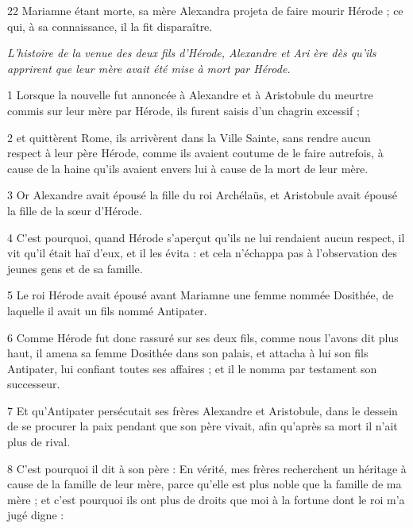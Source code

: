 \par 22 Mariamne étant morte, sa mère Alexandra projeta de faire mourir Hérode ; ce qui, à sa connaissance, il la fit disparaître.


\par \textit{L'histoire de la venue des deux fils d'Hérode, Alexandre et Ari ère dès qu'ils apprirent que leur mère avait été mise à mort par Hérode.}

\par 1 Lorsque la nouvelle fut annoncée à Alexandre et à Aristobule du meurtre commis sur leur mère par Hérode, ils furent saisis d'un chagrin excessif ;

\par 2 et quittèrent Rome, ils arrivèrent dans la Ville Sainte, sans rendre aucun respect à leur père Hérode, comme ils avaient coutume de le faire autrefois, à cause de la haine qu'ils avaient envers lui à cause de la mort de leur mère.

\par 3 Or Alexandre avait épousé la fille du roi Archélaüs, et Aristobule avait épousé la fille de la sœur d'Hérode.

\par 4 C'est pourquoi, quand Hérode s'aperçut qu'ils ne lui rendaient aucun respect, il vit qu'il était haï d'eux, et il les évita : et cela n'échappa pas à l'observation des jeunes gens et de sa famille.

\par 5 Le roi Hérode avait épousé avant Mariamne une femme nommée Dosithée, de laquelle il avait un fils nommé Antipater.

\par 6 Comme Hérode fut donc rassuré sur ses deux fils, comme nous l'avons dit plus haut, il amena sa femme Dosithée dans son palais, et attacha à lui son fils Antipater, lui confiant toutes ses affaires ; et il le nomma par testament son successeur.

\par 7 Et qu'Antipater persécutait ses frères Alexandre et Aristobule, dans le dessein de se procurer la paix pendant que son père vivait, afin qu'après sa mort il n'ait plus de rival.

\par 8 C'est pourquoi il dit à son père : En vérité, mes frères recherchent un héritage à cause de la famille de leur mère, parce qu'elle est plus noble que la famille de ma mère ; et c'est pourquoi ils ont plus de droits que moi à la fortune dont le roi m'a jugé digne :

